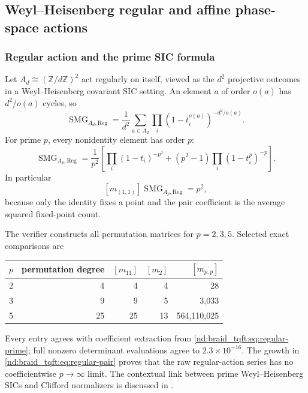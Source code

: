 \documentclass[10pt]{article}
\newcommand{\SMG}{\operatorname{SMG}}
\newcommand{\MGF}{\SMG}
\begin{document}
\subsection{Weyl--Heisenberg regular and affine phase-space actions}

\subsubsection{Regular action and the prime SIC formula}

Let $A_d\cong(\mathbb Z/d\mathbb Z)^2$ act regularly on itself, viewed as the
$d^2$ projective outcomes in a Weyl--Heisenberg covariant SIC setting.  An
element $a$ of order $o(a)$ has $d^2/o(a)$ cycles, so
\begin{equation}\label{nd:braid_tqft:eq:regular-general}
\MGF_{A_d,\mathrm{Reg}}=
\frac1{d^2}\sum_{a\in A_d}\prod_i
(1-t_i^{o(a)})^{-d^2/o(a)}.
\end{equation}
For prime $p$, every nonidentity element has order $p$:
\begin{equation}\label{nd:braid_tqft:eq:regular-prime}
\boxed{\MGF_{A_p,\mathrm{Reg}}=
\frac1{p^2}\left[
\prod_i(1-t_i)^{-p^2}+(p^2-1)\prod_i(1-t_i^p)^{-p}
\right].}
\end{equation}
In particular
\begin{equation}\label{nd:braid_tqft:eq:regular-pair}
[m_{(1,1)}]\MGF_{A_p,\mathrm{Reg}}=p^2,
\end{equation}
because only the identity fixes a point and the pair coefficient is the
average squared fixed-point count.

The verifier constructs all permutation matrices for $p=2,3,5$.  Selected
exact comparisons are
\begin{center}
\begin{tabular}{@{}crrrr@{}}
\toprule
$p$&permutation degree&$[m_{11}]$&$[m_2]$&$[m_{p,p}]$\\
\midrule
2&4&4&4&28\\
3&9&9&5&3,033\\
5&25&25&13&564,110,025\\
\bottomrule
\end{tabular}
\end{center}
Every entry agrees with coefficient extraction from \eqref{nd:braid_tqft:eq:regular-prime};
full nonzero determinant evaluations agree to $2.3\times10^{-16}$.  The growth
in \eqref{nd:braid_tqft:eq:regular-pair} proves that the raw regular-action series has no
coefficientwise $p\to\infty$ limit.  The contextual link between prime
Weyl--Heisenberg SICs and Clifford normalizers is discussed in \cite{nd:braid_tqft:zhu-sic}.
\end{document}
